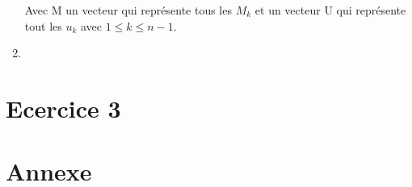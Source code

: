 \documentclass{article}
\begin{document}
\begin{enumerate}
    Avec M un vecteur qui représente tous les $M_k$ \newline
    et un vecteur U qui représente tout les $u_k$ \newline
    avec $1 \le k \le n - 1$.
    

\item 
  
\end{enumerate}

\newpage

\section*{Ecercice 3}

\newpage

\section*{Annexe}
\end{document}
